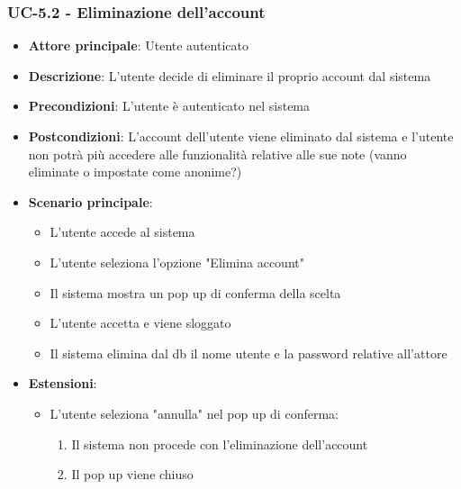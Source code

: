 \documentclass[11pt,a4paper]{article}
\begin{document}
\subsubsection{UC-5.2 - Eliminazione dell'account}
\begin{itemize}
    \item \textbf{Attore principale}: Utente autenticato
    \item \textbf{Descrizione}: L'utente decide di eliminare il proprio account dal sistema
    \item \textbf{Precondizioni}: L'utente è autenticato nel sistema
    \item \textbf{Postcondizioni}: L'account dell'utente viene eliminato dal sistema e l'utente non potrà più accedere alle funzionalità relative alle sue note (vanno eliminate o impostate come anonime?)
    \item \textbf{Scenario principale}:
        \begin{itemize}
            \item L'utente accede al sistema
            \item L'utente seleziona l'opzione "Elimina account"
            \item Il sistema mostra un pop up di conferma della scelta
            \item L'utente accetta e viene sloggato
            \item Il sistema elimina dal db il nome utente e la password relative all'attore
        \end{itemize}
    \item \textbf{Estensioni}:
        \begin{itemize}
            \item L'utente seleziona "annulla" nel pop up di conferma:
                \begin{enumerate}
                    \item Il sistema non procede con l'eliminazione dell'account
                    \item Il pop up viene chiuso
                \end{enumerate}
        \end{itemize}
\end{itemize}
\end{document}
